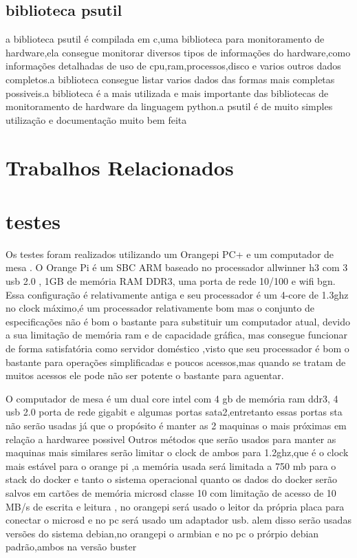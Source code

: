 \documentclass[
	12pt,				%
	openright,			%
	oneside,			%
	a4paper,			%
	english,			%
	french,				%
	spanish,			%
	brazil,				%
	]{abntex2}
\begin{document}
\section{biblioteca psutil}
\label{sec:biblioteca psutil}
a biblioteca psutil é compilada em c,uma biblioteca para monitoramento de hardware,ela consegue monitorar diversos tipos de informações do hardware,como informações detalhadas de uso de cpu,ram,processos,disco e varios outros dados completos.a biblioteca consegue listar varios dados das formas mais completas possiveis.a biblioteca é a mais utilizada e mais importante das bibliotecas de monitoramento de hardware da linguagem python.a psutil é de muito simples utilização e documentação muito bem feita

\chapter{Trabalhos Relacionados}
\label{ch: trabalhos relacionados}


\chapter{testes}
\label{ch: testes}
Os testes foram realizados utilizando um Orangepi PC+ e um computador de mesa .
O Orange Pi é um SBC ARM baseado no processador allwinner h3 com 3 usb 2.0 , 1GB de memória RAM DDR3, uma porta de rede 10/100 e wifi bgn. Essa configuração é relativamente antiga e seu processador é um 4-core de 1.3ghz no clock máximo,é um processador relativamente bom mas o conjunto de especificações não é bom o bastante para substituir um computador atual, devido a sua limitação de memória ram e de capacidade gráfica, mas consegue funcionar de forma satisfatória como servidor doméstico ,visto que seu processador é bom o bastante para operações simplificadas e poucos acessos,mas quando se tratam de muitos acessos ele pode não ser potente o bastante para aguentar.

O computador de mesa é um dual core intel com 4 gb de memória ram ddr3, 4 usb 2.0 porta de rede gigabit e algumas portas sata2,entretanto essas portas sta não serão usadas já que o propósito é manter as 2 maquinas o mais próximas em relação a hardwaree possivel
Outros métodos que serão usados para manter as maquinas mais similares serão limitar o clock de ambos para 1.2ghz,que é o clock mais estável para o orange pi ,a memória usada será limitada a 750 mb para o stack do docker e tanto o sistema operacional quanto os dados do docker serão salvos em cartões de memória microsd classe 10 com limitação de acesso de 10 MB/s de escrita e leitura , no orangepi será usado o leitor da própria placa para conectar o microsd e no pc será usado um adaptador usb.
alem disso serão usadas versões do sistema debian,no orangepi o armbian e no pc o prórpio debian padrão,ambos na versão buster
\end{document}
